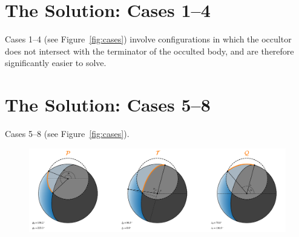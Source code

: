 \documentclass[modern]{aastex62}
\begin{document}
\section{The Solution: Cases 1--4}
\label{sec:cases-1-4}
Cases 1--4 (see Figure~\ref{fig:cases}) involve configurations in which the
occultor does not intersect with
the terminator of the occulted body, and are therefore significantly easier to
solve.

\section{The Solution: Cases 5--8}
\label{sec:cases-5-8}
Cases 5--8 (see Figure~\ref{fig:cases}).

\begin{figure}[t!]
    \begin{centering}
        \includegraphics[width=\linewidth]{figures/geometry.pdf}
    \end{centering}
\end{figure}
\end{document}
